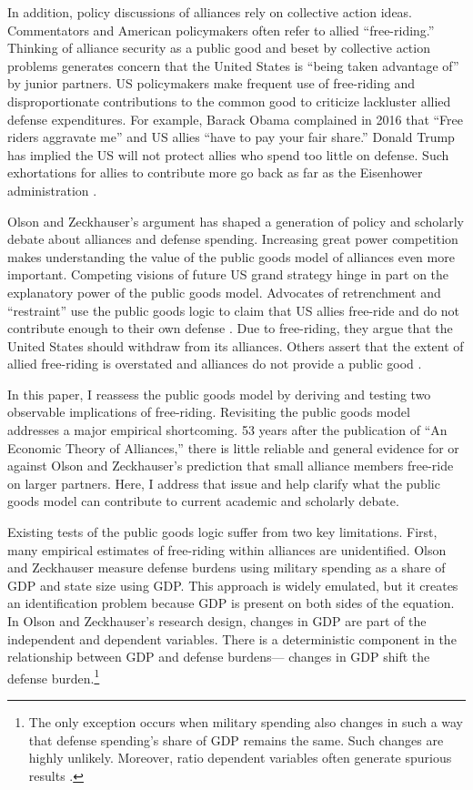 \documentclass[12pt]{article}
\begin{document}
In addition, policy discussions of alliances rely on collective action ideas.
Commentators and American policymakers often refer to allied ``free-riding.'' 
Thinking of alliance security as a public good and beset by collective action problems generates concern that the United States is ``being taken advantage of'' by junior partners. 
US policymakers make frequent use of free-riding and disproportionate contributions to the common good to criticize lackluster allied defense expenditures.  
For example, Barack Obama complained in 2016 that ``Free riders aggravate me'' and US allies ``have to pay your fair share.'' 
Donald Trump has implied the US will not protect allies who spend too little on defense. 
Such exhortations for allies to contribute more go back as far as the Eisenhower administration \citep{Lanoszka2015}.


Olson and Zeckhauser's argument has shaped a generation of policy and scholarly debate about alliances and defense spending. 
Increasing great power competition makes understanding the value of the public goods model of alliances even more important. 
Competing visions of future US grand strategy hinge in part on the explanatory power of the public goods model. 
Advocates of retrenchment and ``restraint'' use the public goods logic to claim that US allies free-ride and do not contribute enough to their own defense \citep{Preble2009, Posen2014}. 
Due to free-riding, they argue that the United States should withdraw from its alliances.
Others assert that the extent of allied free-riding is overstated and alliances do not provide a public good \citep{Brooksetal2013, BrandsFeaver2017}. 


In this paper, I reassess the public goods model by deriving and testing two observable implications of free-riding. 
Revisiting the public goods model addresses a major empirical shortcoming.
53 years after the publication of ``An Economic Theory of Alliances,'' there is little reliable and general evidence for or against Olson and Zeckhauser's prediction that small alliance members free-ride on larger partners. 
Here, I address that issue and help clarify what the public goods model can contribute to current academic and scholarly debate. 


Existing tests of the public goods logic suffer from two key limitations.
First, many empirical estimates of free-riding within alliances are unidentified.
Olson and Zeckhauser measure defense burdens using military spending as a share of GDP and state size using GDP.
This approach is widely emulated, but it creates an identification problem because GDP is present on both sides of the equation.
In Olson and Zeckhauser's research design, changes in GDP are part of the independent and dependent variables. 
There is a deterministic component in the relationship between GDP and defense burdens--- changes in GDP shift the defense burden.\footnote{
The only exception occurs when military spending also changes in such a way that defense spending's share of GDP remains the same. Such changes are highly unlikely. Moreover, ratio dependent variables often generate spurious results \citep{Kronmal1993}.}  
 
\end{document}
